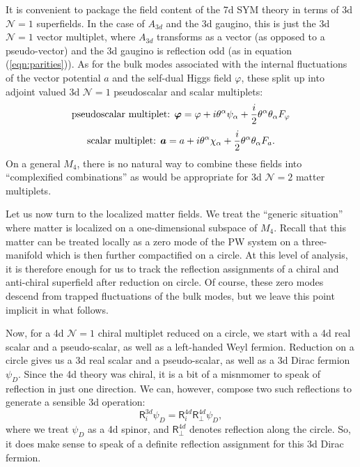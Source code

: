 \documentclass[12pt]{article}%
\numberwithin{equation}{section}
\renewcommand{\(}{\left(}
\renewcommand{\)}{\right)}
\renewcommand{\[}{\left[}
\renewcommand{\]}{\right]}
\begin{document}
It is convenient to package the field content of the 7d SYM theory in terms of 3d $\mathcal{N} = 1$ superfields. In the case of $A_{3d}$ and the 3d gaugino, this is just the 3d $\mathcal{N} = 1$ vector multiplet, where $A_{3d}$ transforms as a vector (as opposed to a pseudo-vector) and the 3d gaugino is reflection odd (as in equation (\ref{eqn:parities})). As for the bulk modes associated with the internal fluctuations of the vector potential $a$ and the self-dual Higgs field $\varphi$, these split up into adjoint valued 3d $\mathcal{N} = 1$ pseudoscalar and scalar multiplets:
\begin{equation}
\textnormal{pseudoscalar multiplet:  } \boldsymbol{\varphi}=\varphi+i\theta^\alpha \psi_\alpha + \frac{i}{2}\theta^\alpha \theta_\alpha F_{\varphi}
\end{equation}
\begin{equation}
\textnormal{scalar multiplet:  } \boldsymbol{a}=a+i\theta^\alpha \chi_\alpha +\frac{i}{2} \theta^\alpha \theta_\alpha F_{a}.
\end{equation}
On a general $M_4$, there is no natural way to combine these fields into
``complexified combinations'' as would be appropriate for 3d $\mathcal{N} =2 $ matter multiplets.

Let us now turn to the localized matter fields. We treat the ``generic situation'' where matter is localized on a one-dimensional subspace of $M_4$. Recall that this matter can be treated locally as a zero mode of the PW system on a three-manifold which is then further compactified on a circle. At this level of analysis, it is therefore enough for us to track the reflection assignments of a chiral and anti-chiral superfield after reduction on circle. Of course, these zero modes descend from trapped fluctuations of the bulk modes, but we leave this point implicit in what follows.

Now, for a 4d $\mathcal{N} = 1$ chiral multiplet reduced on a circle, we start with a 4d real scalar and a pseudo-scalar, as well as a left-handed Weyl fermion. Reduction on a circle gives us a 3d real scalar and a pseudo-scalar, as well as a 3d Dirac fermion $\psi_{D}$. Since the 4d theory was chiral, it is a bit of a misnmomer to speak of reflection in just one direction. We can, however, compose two such reflections to generate a sensible 3d operation:
\begin{equation}\label{eq:4d3dperp}
\mathsf{R}_{i}^{3d} \psi_{D} = \mathsf{R}_{i}^{4d} \mathsf{R}_{\bot}^{4d} \psi_{D},
\end{equation}
where we treat $\psi_{D}$ as a 4d spinor, and $\mathsf{R}_{\bot}^{4d}$ denotes reflection along the circle. So, it does make sense to speak of a definite reflection assignment for this 3d Dirac fermion.
\end{document}
